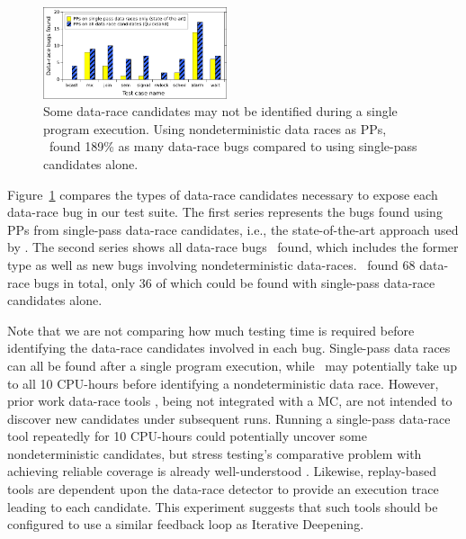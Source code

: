 \begin{figure}[t]
	\includegraphics[width=0.48\textwidth]{nondet-drs-1-v2.pdf}
	\caption{Some data-race candidates may not be identified during a single program execution.
		Using nondeterministic data races as PPs,
		\quicksand~found 189\% as many data-race bugs compared to using single-pass candidates alone.
	}
	\label{fig:dr-falsenegs}
\end{figure}
Figure~\ref{fig:dr-falsenegs} compares the types of data-race candidates necessary to expose each data-race bug in our test suite.
The first series represents the bugs found using PPs from single-pass data-race candidates,
i.e., the state-of-the-art approach used by \cite{racefuzzer,portend}.
The second series shows all data-race bugs \quicksand~found,
which includes the former type as well as new bugs involving nondeterministic data-races.
\quicksand~found 68 data-race bugs in total, only 36 of which could be found with single-pass data-race candidates alone.


Note that we are not comparing how much testing time is required before identifying the data-race candidates involved in each bug.
Single-pass data races can all be found after a single program execution,
while \quicksand~may potentially take up to all 10 CPU-hours before identifying a nondeterministic data race.
However, prior work data-race tools \cite{tsan}, being not integrated with a MC,
are not intended to discover new candidates under subsequent runs.
Running a single-pass data-race tool repeatedly for 10 CPU-hours could potentially uncover some nondeterministic candidates,
but stress testing's comparative problem with achieving reliable coverage is already well-understood
\cite{chess-icb,gambit}.
Likewise, replay-based tools \cite{portend} are dependent upon the data-race detector to provide an execution trace leading to each candidate.
This experiment suggests that
such tools should be configured to use a similar feedback loop as Iterative Deepening.


